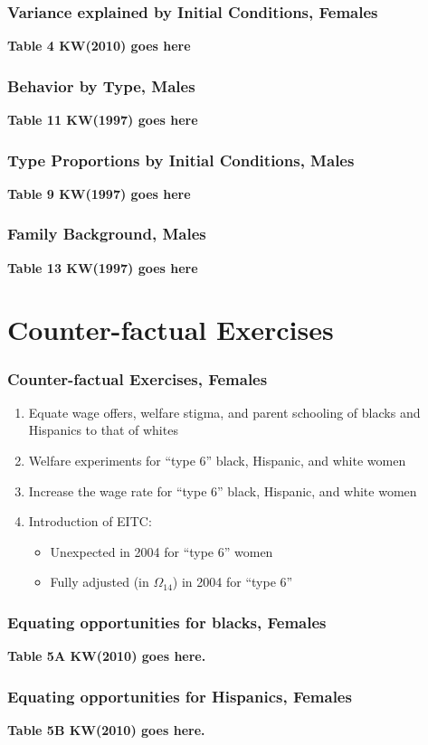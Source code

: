 \begin{frame}
	\frametitle{Variance explained by Initial Conditions, Females}
	\textbf{Table 4 KW(2010) goes here}	
\end{frame}

\begin{frame}
	\frametitle{Behavior by Type, Males}
	\textbf{Table 11 KW(1997) goes here}	
\end{frame}

\begin{frame}
	\frametitle{Type Proportions by Initial Conditions, Males}
	\textbf{Table 9 KW(1997) goes here}	
\end{frame}

\begin{frame}
	\frametitle{Family Background, Males}
	\textbf{Table 13 KW(1997) goes here}	
\end{frame}

\section{Counter-factual Exercises}

\begin{frame}
	\frametitle{Counter-factual Exercises, Females}
		\begin{enumerate}
			\item Equate wage offers, welfare stigma, and parent schooling of blacks and Hispanics to that of whites 
			\item Welfare experiments for ``type 6'' black, Hispanic, and white women 
			\item Increase the wage rate for ``type 6'' black, Hispanic, and white women
			\item Introduction of EITC:
				\begin{itemize}
					\item Unexpected in 2004 for ``type 6'' women
					\item Fully adjusted (in $\Omega_{14}$) in 2004 for ``type 6''
				\end{itemize}							
		\end{enumerate}
\end{frame}

\begin{frame}
	\frametitle{Equating opportunities for blacks, Females}
		\textbf{Table 5A KW(2010) goes here.}
\end{frame}

\begin{frame}
	\frametitle{Equating opportunities for Hispanics, Females}
		\textbf{Table 5B KW(2010) goes here.}
\end{frame}

